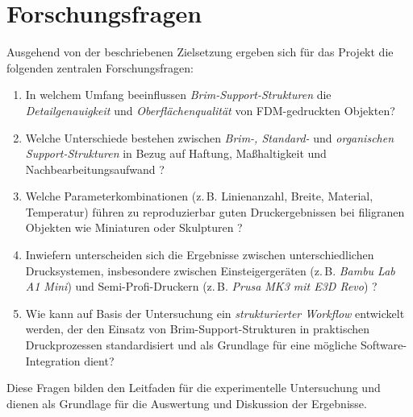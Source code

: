 \chapter{Forschungsfragen}
\label{cha:Forschungsfragen}

Ausgehend von der beschriebenen Zielsetzung ergeben sich für das Projekt die folgenden zentralen Forschungsfragen:

\begin{enumerate}
  \item In welchem Umfang beeinflussen \textit{Brim-Support-Strukturen} die \textit{Detailgenauigkeit} und \textit{Oberflächenqualität} von FDM-gedruckten Objekten?
  \item Welche Unterschiede bestehen zwischen \textit{Brim-, Standard-} und \textit{organischen Support-Strukturen} in Bezug auf Haftung, Maßhaltigkeit und Nachbearbeitungsaufwand \cite{Facfox2023, JLC3DP2023}?
  \item Welche Parameterkombinationen (z.\,B. Linienanzahl, Breite, Material, Temperatur) führen zu reproduzierbar guten Druckergebnissen bei filigranen Objekten wie Miniaturen oder Skulpturen \cite{Kristiawan2021, FFFPolymerReview}?
  \item Inwiefern unterscheiden sich die Ergebnisse zwischen unterschiedlichen Drucksystemen, insbesondere zwischen Einsteigergeräten (z.\,B. \textit{Bambu Lab A1 Mini}) und Semi-Profi-Druckern (z.\,B. \textit{Prusa MK3 mit E3D Revo}) \cite{FDMReview2021}?
  \item Wie kann auf Basis der Untersuchung ein \textit{strukturierter Workflow} entwickelt werden, der den Einsatz von Brim-Support-Strukturen in praktischen Druckprozessen standardisiert und als Grundlage für eine mögliche Software-Integration dient?
\end{enumerate}

Diese Fragen bilden den Leitfaden für die experimentelle Untersuchung und dienen als Grundlage für die Auswertung und Diskussion der Ergebnisse.